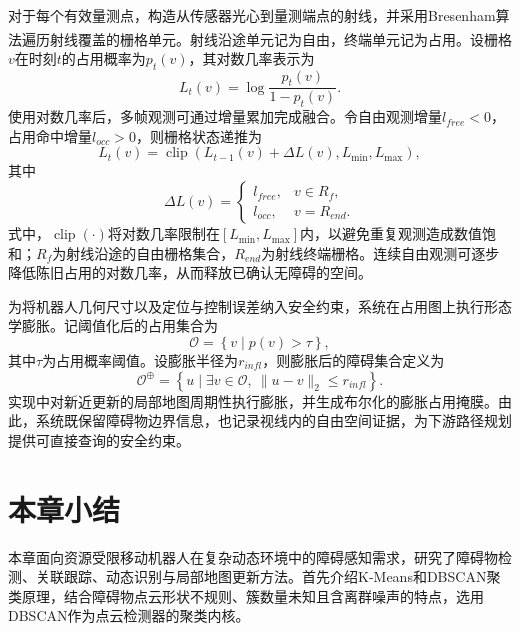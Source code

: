 对于每个有效量测点，构造从传感器光心到量测端点的射线，并采用Bresenham算法\textsuperscript{\cite{9702849}}遍历射线覆盖的栅格单元。射线沿途单元记为自由，终端单元记为占用。设栅格$v$在时刻$t$的占用概率为$p_t(v)$，其对数几率表示为
\begin{equation}
    L_t(v)=\log\frac{p_t(v)}{1-p_t(v)}.
    \label{eq:local_map_logodds}
\end{equation}
使用对数几率后，多帧观测可通过增量累加完成融合。令自由观测增量$l_{free}<0$，占用命中增量$l_{occ}>0$，则栅格状态递推为
\begin{equation}
    L_t(v)=\operatorname{clip}\!\left(L_{t-1}(v)+\Delta L(v),L_{\min},L_{\max}\right),
    \label{eq:local_map_update}
\end{equation}
其中
\begin{equation}
    \Delta L(v)=
    \begin{cases}
        l_{free}, & v\in R_f,\\
        l_{occ},  & v=R_{end}.
    \end{cases}
    \label{eq:local_map_inverse_sensor}
\end{equation}
式中，$\operatorname{clip}(\cdot)$将对数几率限制在$[L_{\min},L_{\max}]$内，以避免重复观测造成数值饱和；$R_f$为射线沿途的自由栅格集合，$R_{end}$为射线终端栅格。连续自由观测可逐步降低陈旧占用的对数几率，从而释放已确认无障碍的空间。

为将机器人几何尺寸以及定位与控制误差纳入安全约束，系统在占用图上执行形态学膨胀。记阈值化后的占用集合为
\begin{equation}
    \mathcal{O}=\left\{v\mid p(v)>\tau\right\},
    \label{eq:occupied_set}
\end{equation}
其中$\tau$为占用概率阈值。设膨胀半径为$r_{infl}$，则膨胀后的障碍集合定义为
\begin{equation}
    \mathcal{O}^{\oplus}
    =\left\{u\mid \exists v\in\mathcal{O},\ \|u-v\|_2\leq r_{infl}\right\}.
    \label{eq:inflated_obstacle_set}
\end{equation}
实现中对新近更新的局部地图周期性执行膨胀，并生成布尔化的膨胀占用掩膜。由此，系统既保留障碍物边界信息，也记录视线内的自由空间证据，为下游路径规划提供可直接查询的安全约束。

\section{本章小结}
本章面向资源受限移动机器人在复杂动态环境中的障碍感知需求，研究了障碍物检测、关联跟踪、动态识别与局部地图更新方法。首先介绍K-Means和DBSCAN聚类原理，结合障碍物点云形状不规则、簇数量未知且含离群噪声的特点，选用DBSCAN作为点云检测器的聚类内核。

